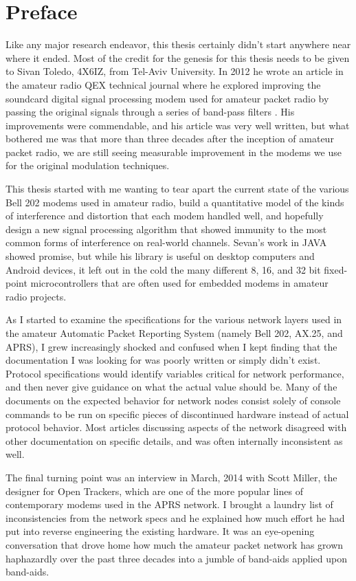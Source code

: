 \chapter{Preface}

Like any major research endeavor, this thesis certainly didn't start anywhere near
where it ended.
Most of the credit for the genesis for this thesis needs to be given to 
Sivan Toledo, 4X6IZ, from Tel-Aviv University. In 2012 he wrote an article in the
amateur radio QEX technical journal where he explored improving the soundcard 
digital signal processing modem used for amateur packet radio by passing the 
original signals through a series of band-pass filters \cite{sevanhighperf}. 
His improvements were
commendable, and his article was very well written, but what bothered me was that 
more than three decades after the inception of amateur packet radio,
we are still seeing
measurable improvement in the modems we use for the original modulation techniques.

This thesis started with me wanting to tear apart the current state of the various
Bell 202 modems used in amateur radio, build a quantitative model of the kinds of
interference and distortion that each modem handled well, and hopefully design
a new signal processing algorithm that showed immunity to the most common forms of
interference on real-world channels. Sevan's work in JAVA showed promise, but 
while his library is useful on desktop computers and Android devices, it left 
out in the cold the many different 8, 16, and 32 bit fixed-point microcontrollers
that are often used for embedded modems in amateur radio projects.

As I started to examine the specifications for the various network layers used
in the amateur Automatic Packet Reporting System (namely Bell 202, AX.25, and
APRS), I grew increasingly shocked and confused when I kept finding that the
documentation I was looking for was poorly written or simply didn't exist. 
Protocol specifications would identify variables critical for network performance,
and then never give guidance on what the actual value should be.
Many of the documents
on the expected behavior for network nodes consist solely of console commands
to be run on specific pieces of discontinued hardware instead of actual protocol
behavior.
Most articles discussing aspects of the network disagreed with 
other documentation on specific details,
and was often internally inconsistent as well.

The final turning point was an interview in March, 2014 with Scott Miller, the
designer for Open Trackers, 
which are one of the more popular lines of contemporary modems used in the APRS
network.
I brought a laundry list of inconsistencies from the network specs and he
explained how much effort he had put into reverse engineering the existing 
hardware. It was an eye-opening conversation that drove home how much the 
amateur packet network has grown haphazardly over the past three decades into
a jumble of band-aids applied upon band-aids.

